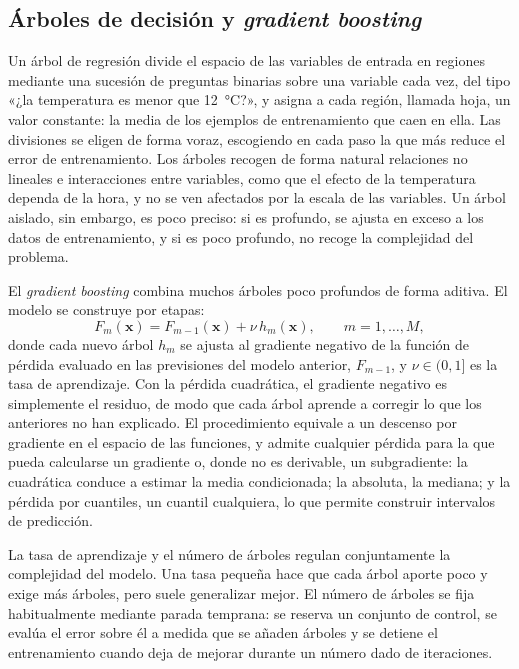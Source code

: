 \subsection{Árboles de decisión y \textit{gradient boosting}}\label{sec:boosting}

Un árbol de regresión divide el espacio de las variables de entrada en
regiones mediante una sucesión de preguntas binarias sobre una variable cada
vez, del tipo «¿la temperatura es menor que 12~°C?», y asigna a cada región,
llamada hoja, un valor constante: la media de los ejemplos de entrenamiento
que caen en ella. Las divisiones se eligen de forma voraz, escogiendo en cada
paso la que más reduce el error de entrenamiento. Los árboles recogen de
forma natural relaciones no lineales e interacciones entre variables, como
que el efecto de la temperatura dependa de la hora, y no se ven afectados
por la escala de las variables. Un árbol aislado, sin embargo, es poco
preciso: si es profundo, se ajusta en exceso a los datos de entrenamiento, y
si es poco profundo, no recoge la complejidad del problema.

El \textit{gradient boosting} \parencite{friedman2001greedy} combina muchos
árboles poco profundos de forma aditiva. El modelo se construye por etapas:
\begin{equation}
	F_m(\mathbf{x}) = F_{m-1}(\mathbf{x}) + \nu \, h_m(\mathbf{x}),
	\qquad m = 1, \dots, M,
\end{equation}
donde cada nuevo árbol $h_m$ se ajusta al gradiente negativo de la función
de pérdida evaluado en las previsiones del modelo anterior, $F_{m-1}$, y
$\nu \in (0, 1]$ es la tasa de aprendizaje. Con la pérdida cuadrática, el
gradiente negativo es simplemente el residuo, de modo que cada árbol aprende
a corregir lo que los anteriores no han explicado. El procedimiento equivale
a un descenso por gradiente en el espacio de las funciones, y admite
cualquier pérdida para la que pueda calcularse un gradiente o, donde no es
derivable, un subgradiente: la cuadrática conduce a estimar la media
condicionada; la absoluta, la mediana; y la pérdida por cuantiles, un
cuantil cualquiera, lo que permite construir intervalos de predicción.

La tasa de aprendizaje y el número de árboles regulan conjuntamente la
complejidad del modelo. Una tasa pequeña hace que cada árbol aporte poco y
exige más árboles, pero suele generalizar mejor. El número de árboles se
fija habitualmente mediante parada temprana: se reserva un conjunto de
control, se evalúa el error sobre él a medida que se añaden árboles y se
detiene el entrenamiento cuando deja de mejorar durante un número dado de
iteraciones.

